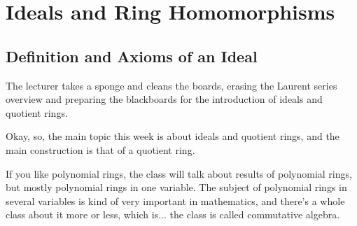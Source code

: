 \begin{hidden}
\end{hidden}

\section{Ideals and Ring Homomorphisms}

\subsection{Definition and Axioms of an Ideal}

\begin{note}
The lecturer takes a sponge and cleans the boards, erasing the Laurent series overview and preparing the blackboards for the introduction of ideals and quotient rings.
\end{note}

\begin{speech}[00:15:33 - 00:16:29]
Okay, so, the main topic this week is about ideals and quotient rings, and the main construction is that of a quotient ring. 

If you like polynomial rings, the class will talk about results of polynomial rings, but mostly polynomial rings in one variable. The subject of polynomial rings in several variables is kind of very important in mathematics, and there's a whole class about it more or less, which is... the class is called commutative algebra.
\end{speech}

